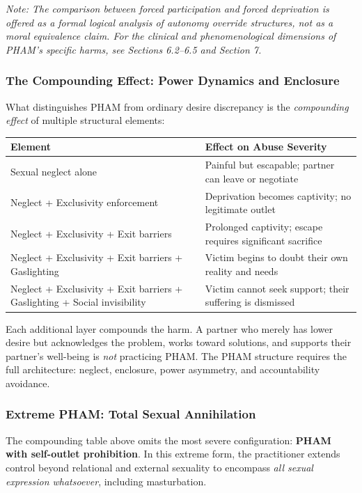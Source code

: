 \documentclass[12pt, letterpaper]{article}
\begin{document}
\textit{Note: The comparison between forced participation and forced deprivation is offered as a formal logical analysis of autonomy override structures, not as a moral equivalence claim. For the clinical and phenomenological dimensions of PHAM's specific harms, see Sections 6.2--6.5 and Section 7.}

\subsubsection{The Compounding Effect: Power Dynamics and Enclosure}

What distinguishes PHAM from ordinary desire discrepancy is the \textit{compounding effect} of multiple structural elements:

\begin{center}
\begin{tabular}{|p{2.5in}|p{2.5in}|}
\hline
\textbf{Element} & \textbf{Effect on Abuse Severity} \\
\hline
Sexual neglect alone & Painful but escapable; partner can leave or negotiate \\
\hline
Neglect + Exclusivity enforcement & Deprivation becomes captivity; no legitimate outlet \\
\hline
Neglect + Exclusivity + Exit barriers & Prolonged captivity; escape requires significant sacrifice \\
\hline
Neglect + Exclusivity + Exit barriers + Gaslighting & Victim begins to doubt their own reality and needs \\
\hline
Neglect + Exclusivity + Exit barriers + Gaslighting + Social invisibility & Victim cannot seek support; their suffering is dismissed \\
\hline
\end{tabular}
\end{center}

Each additional layer compounds the harm. A partner who merely has lower desire but acknowledges the problem, works toward solutions, and supports their partner's well-being is \textit{not} practicing PHAM. The PHAM structure requires the full architecture: neglect, enclosure, power asymmetry, and accountability avoidance.

\subsubsection{Extreme PHAM: Total Sexual Annihilation}

The compounding table above omits the most severe configuration: \textbf{PHAM with self-outlet prohibition}. In this extreme form, the practitioner extends control beyond relational and external sexuality to encompass \textit{all sexual expression whatsoever}, including masturbation.
\end{document}
